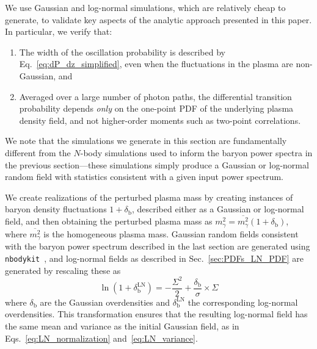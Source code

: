 \documentclass[prd,aps,10pt,nofootinbib,twocolumn,superscriptaddress,preprintnumbers,balancelastpage,longbibliography]{revtex4-1}
\begin{document}
We use Gaussian and log-normal simulations, which are relatively cheap to generate, to validate key aspects of the analytic approach presented in this paper. In particular, we verify that:
\begin{enumerate}
    \item The width of the oscillation probability is described by Eq.~\eqref{eq:dP_dz_simplified}, even when the fluctuations in the plasma are non-Gaussian, and
    \item Averaged over a large number of photon paths, the differential transition probability depends \emph{only} on the one-point PDF of the underlying plasma density field, and not higher-order moments such as two-point correlations.
\end{enumerate}

We note that the simulations we generate in this section are fundamentally different from the $N$-body simulations used to inform the baryon power spectra in the previous section---these simulations simply produce a Gaussian or log-normal random field with statistics consistent with a given input power spectrum.

We create realizations of the perturbed plasma mass by creating instances of baryon density fluctuations $1 + \delta_\mathrm{b}$, described either as a Gaussian or log-normal field, and then obtaining the perturbed plasma mass as $m_\gamma^2 = \overline{m_\gamma^2}(1 + \delta_\mathrm{b})$, where $\overline{m_\gamma^2}$ is the homogeneous plasma mass. Gaussian random fields consistent with the baryon power spectrum described in the last section are generated using \texttt{nbodykit}~\cite{Hand:2017pqn}, and log-normal fields as described in Sec.~\ref{sec:PDFs_LN_PDF} are generated by rescaling these as
\begin{equation}
    \ln(1 + \delta_\mathrm{b}^{\mathrm{LN}}) = -\frac{\Sigma^2}{2} + \frac{\delta_\mathrm{b}}{\sigma}\times \Sigma
\end{equation}
where $\delta_\mathrm{b}$ are the Gaussian overdensities and $\delta_\mathrm{b}^{\mathrm{LN}}$ the corresponding log-normal overdensities. This transformation ensures that the resulting log-normal field has the same mean and variance as the initial Gaussian field, as in Eqs.~\eqref{eq:LN_normalization} and~\eqref{eq:LN_variance}.
\end{document}
